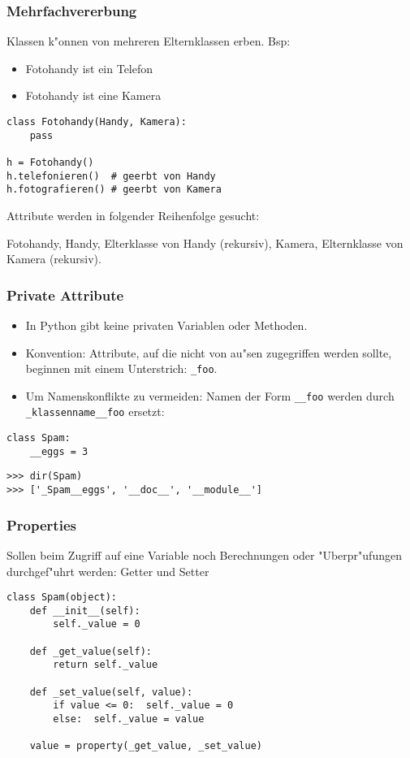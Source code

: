 \begin{frame}[fragile]
\frametitle{Mehrfachvererbung}
Klassen k"onnen von mehreren Elternklassen erben. Bsp:
\begin{itemize}
\item Fotohandy ist ein Telefon
\item Fotohandy ist eine Kamera
\end{itemize}
\begin{lstlisting}[style=Python]
class Fotohandy(Handy, Kamera):
    pass

h = Fotohandy()
h.telefonieren()  # geerbt von Handy
h.fotografieren() # geerbt von Kamera
\end{lstlisting}
Attribute werden in folgender Reihenfolge gesucht:

Fotohandy, Handy, Elterklasse von Handy (rekursiv), Kamera, Elternklasse von Kamera (rekursiv).
\end{frame}

\begin{frame}[fragile]
\frametitle{Private Attribute}
\begin{itemize}
\item In Python gibt keine privaten Variablen oder Methoden. 
\item \alert{Konvention:} Attribute, auf die nicht von au"sen zugegriffen werden sollte, beginnen mit einem Unterstrich: \lstinline{_foo}.
\item Um Namenskonflikte zu vermeiden: Namen der Form \lstinline{__foo} werden durch \lstinline{_klassenname__foo} ersetzt:
\end{itemize}
\begin{lstlisting}[style=Python]
class Spam:
    __eggs = 3
\end{lstlisting}
\begin{lstlisting}[style=Shell]
>>> dir(Spam)
>>> ['_Spam__eggs', '__doc__', '__module__']
\end{lstlisting}
\end{frame}

\begin{frame}[fragile]
\frametitle{Properties}
Sollen beim Zugriff auf eine Variable noch Berechnungen oder "Uberpr"ufungen durchgef"uhrt werden: \alert{Getter} und \alert{Setter}
\begin{lstlisting}[style=Python]
class Spam(object):
    def __init__(self):
        self._value = 0
    
    def _get_value(self):
        return self._value

    def _set_value(self, value):
        if value <= 0:  self._value = 0
        else:  self._value = value

    value = property(_get_value, _set_value)
\end{lstlisting}
\end{frame}

